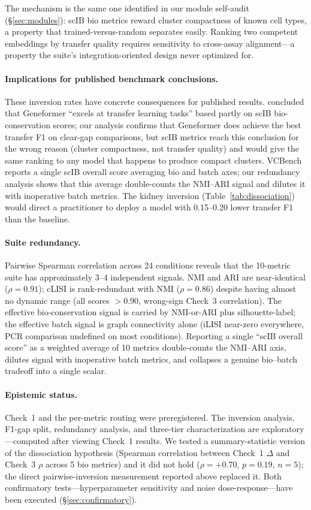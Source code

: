 \documentclass[10pt,letterpaper]{article}
\begin{document}
The mechanism is the same one identified in our module self-audit (\S\ref{sec:modules}): scIB bio metrics reward cluster compactness of known cell types, a property that trained-versus-random separates easily. Ranking two competent embeddings by transfer quality requires sensitivity to cross-assay alignment---a property the suite's integration-oriented design never optimized for.

\paragraph{Implications for published benchmark conclusions.} These inversion rates have concrete consequences for published results. \citet{wu2025scfm} concluded that Geneformer ``excels at transfer learning tasks'' based partly on scIB bio-conservation scores; our analysis confirms that Geneformer does achieve the best transfer F1 on clear-gap comparisons, but scIB metrics reach this conclusion for the wrong reason (cluster compactness, not transfer quality) and would give the same ranking to any model that happens to produce compact clusters. VCBench \citep{vcbench2026} reports a single scIB overall score averaging bio and batch axes; our redundancy analysis shows that this average double-counts the NMI--ARI signal and dilutes it with inoperative batch metrics. The kidney inversion (Table~\ref{tab:dissociation}) would direct a practitioner to deploy a model with 0.15--0.20 lower transfer F1 than the baseline.

\paragraph{Suite redundancy.} Pairwise Spearman correlation across 24 conditions reveals that the 10-metric suite has approximately 3--4 independent signals. NMI and ARI are near-identical ($\rho = 0.91$); cLISI is rank-redundant with NMI ($\rho = 0.86$) despite having almost no dynamic range (all scores $> 0.90$, wrong-sign Check~3 correlation). The effective bio-conservation signal is carried by NMI-or-ARI plus silhouette-label; the effective batch signal is graph connectivity alone (iLISI near-zero everywhere, PCR comparison undefined on most conditions). Reporting a single ``scIB overall score'' as a weighted average of 10 metrics double-counts the NMI--ARI axis, dilutes signal with inoperative batch metrics, and collapses a genuine bio--batch tradeoff into a single scalar.

\paragraph{Epistemic status.} Check~1 and the per-metric routing were preregistered. The inversion analysis, F1-gap split, redundancy analysis, and three-tier characterization are exploratory---computed after viewing Check~1 results. We tested a summary-statistic version of the dissociation hypothesis (Spearman correlation between Check~1 $\Delta$ and Check~3 $\rho$ across 5 bio metrics) and it did not hold ($\rho = +0.70$, $p = 0.19$, $n = 5$); the direct pairwise-inversion measurement reported above replaced it. Both confirmatory tests---hyperparameter sensitivity and noise dose-response---have been executed (\S\ref{sec:confirmatory}).
\end{document}
